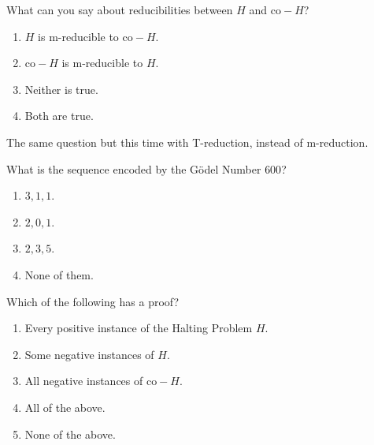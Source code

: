 \documentclass[10pt]{article}
\begin{document}
\bigskip



\bigskip \noindent  What can you say about reducibilities between $H$ and $\mathrm{co-}H$?

\begin{enumerate}[{\bf (A)}]
\addtolength{\itemsep}{-5pt} 
\item $H$ is m-reducible to $\mathrm{co-}H$. 
\item $\mathrm{co-}H$ is m-reducible to $H$.
\item Neither is true.
\item Both are true. 
\end{enumerate}

The same question but this time with T-reduction, instead of m-reduction.

\bigskip



\bigskip \noindent  What is the sequence encoded by the G{\"o}del Number $600$?

\begin{enumerate}[{\bf (A)}]
\addtolength{\itemsep}{-5pt} 
\item $3, 1, 1$. 
\item $2, 0, 1$.
\item $2, 3, 5$. 
\item None of them. 
\end{enumerate}

\newpage


\bigskip \noindent  Which of the following has a proof?
\begin{enumerate}[{\bf (A)}]
\addtolength{\itemsep}{-5pt} 
\item Every positive instance of the Halting Problem $H$. 
\item Some negative instances of $H$.
\item All negative instances of $\mathrm{co-}H$.
\item All of the above. 
\item None of the above. 
\end{enumerate}
\end{document}
